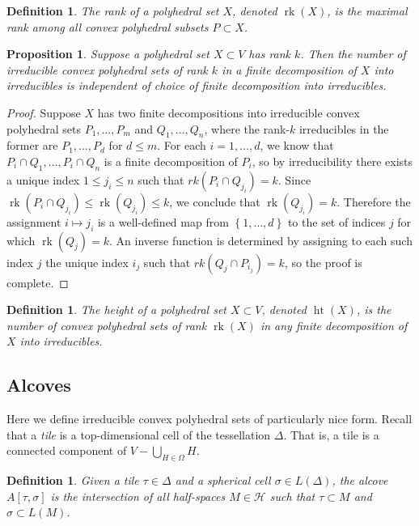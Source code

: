 \documentclass[11pt]{amsart}
\newtheorem{prop}[theorem]{Proposition}
\newtheorem{definition}[theorem]{Definition}
\numberwithin{table}{section}
\numberwithin{figure}{section}
\theoremstyle{remark}
\providecommand{\set}[1]{\left\lbrace#1\right\rbrace}
\DeclareMathOperator{\rk}{rk}
\DeclareMathOperator{\height}{ht}
\begin{document}
\begin{definition}
  The {\em rank} of a polyhedral set $X$, denoted $\rk(X)$, is the
  maximal rank among all convex polyhedral subsets $P\subset X$.
\end{definition}

\begin{prop} \label{prop:height-well-def} Suppose a polyhedral set $X\subset V$ has
  rank $k$. Then the number of irreducible convex polyhedral sets of
  rank $k$ in a finite decomposition of $X$ into irreducibles is
  independent of choice of finite decomposition into irreducibles.
\end{prop}
\begin{proof}
  Suppose $X$ has two finite decompositions into irreducible convex
  polyhedral sets $P_1,\dotsc, P_m$ and $Q_1,\dotsc, Q_n$, where the
  rank-$k$ irreducibles in the former are $P_1,\dotsc, P_d$ for
  $d\leq m$. For each $i=1,\dotsc, d$, we know that
  $P_i \cap Q_1, \dotsc, P_i \cap Q_n$ is a finite decomposition of
  $P_i$, so by irreducibility there exists a unique index
  $1\leq j_i \leq n$ such that $rk(P_i \cap Q_{j_i}) = k$. Since
  $\rk(P_i\cap Q_{j_i}) \leq \rk(Q_{j_i})\leq k$, we conclude that
  $\rk(Q_{j_i}) = k$. Therefore the assignment $i \mapsto j_i$ is a
  well-defined map from $\set{1,\dots, d}$ to the set of indices $j$
  for which $\rk(Q_j)=k$. An inverse function is determined by
  assigning to each such index $j$ the unique index $i_j$ such that
  $rk(Q_j \cap P_{i_j}) = k$, so the proof is complete.
\end{proof}

\begin{definition}
  The {\em height} of a polyhedral set $X\subset V$, denoted
  $\height(X)$, is the number of convex polyhedral sets of rank
  $\rk(X)$ in any finite decomposition of $X$ into irreducibles.
\end{definition}

\subsection{Alcoves}


Here we define irreducible convex polyhedral sets of
particularly nice form. Recall that a {\em tile} is a top-dimensional
cell of the tessellation $\Delta$. That is, a tile is a connected
component of $V - \bigcup_{H\in \Omega} H$.
\begin{definition}
  Given a tile $\tau \in \Delta$ and a spherical cell $\sigma \in
  L(\Delta)$, the {\em alcove} $A[\tau,\sigma]$ is the intersection of
  all half-spaces $M \in \mathcal{H}$ such that $\tau \subset M$ and
  $\sigma \subset L(M)$.
\end{definition}
\end{document}
